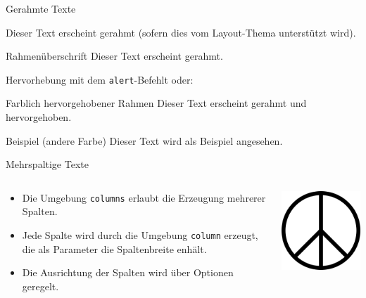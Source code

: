 \documentclass{beamer}
\begin{document}
\begin{frame}{Gerahmte Texte}
    \begin{block}{}
        Dieser Text erscheint gerahmt (sofern dies vom Layout-Thema unterst\"utzt wird).
    \end{block}
    \begin{block}{Rahmen\"uberschrift}
        Dieser Text erscheint gerahmt.
    \end{block}
    \alert{Hervorhebung} mit dem \texttt{alert}-Befehlt oder:
    \begin{alertblock}{Farblich hervorgehobener Rahmen}
        Dieser Text erscheint gerahmt und hervorgehoben.
    \end{alertblock}
    \begin{exampleblock}{Beispiel (andere Farbe)}
        Dieser Text wird als Beispiel angesehen.
    \end{exampleblock}
\end{frame}

\begin{frame}{Mehrspaltige Texte}
    \transdissolve
    \begin{columns}
        \begin{column}{5cm}
            \begin{itemize}
            \item Die Umgebung \texttt{columns} erlaubt die Erzeugung mehrerer Spalten.
            \item<2-> Jede Spalte wird durch die Umgebung \texttt{column} erzeugt, die als Parameter die Spaltenbreite enh\"alt.
            \item<2-> Die Ausrichtung der Spalten wird \"uber Optionen geregelt.
            \end{itemize}
        \end{column}
        \begin{column}{5cm}
             {\includegraphics[clip,width=5cm]{give_peace_a_chance}}
        \end{column}
    \end{columns}
\end{frame}
\end{document}
